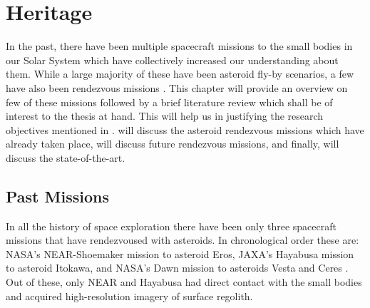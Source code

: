\chapter{Heritage}
\label{chap:heritage}
\graphicspath{{Mission_Heritage/Images/}}

In the past, there have been multiple spacecraft missions to the small bodies in our Solar System which have collectively increased our understanding about them. While a large majority of these have been asteroid fly-by scenarios, a few have also been rendezvous missions \parencite{esa_mission2asteroids_web}. This chapter will provide an overview on few of these missions followed by a brief literature review which shall be of interest to the thesis at hand. This will help us in justifying the research objectives mentioned in .  will discuss the asteroid rendezvous missions which have already taken place,  will discuss future rendezvous missions, and finally,  will discuss the state-of-the-art.

\section{Past Missions}
\label{sec:past_missions}
In all the history of space exploration there have been only three spacecraft missions that have rendezvoused with asteroids. In chronological order these are: \gls{NASA}'s \gls{NEAR}-Shoemaker mission to asteroid Eros, \gls{JAXA}'s Hayabusa mission to asteroid Itokawa, and \gls{NASA}'s Dawn mission to asteroids Vesta and Ceres \parencite{scheeresBook}. Out of these, only \gls{NEAR} and Hayabusa had direct contact with the small bodies and acquired high-resolution imagery of surface regolith.


